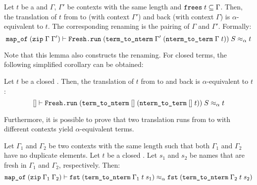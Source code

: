 \begin{lemma}
  Let $t$ be a  and $\Gamma$, $\Gamma'$ be contexts with the same length and $\texttt{\textup{frees}}\;t \subseteq \Gamma$.
  Then, the translation of $t$ from  to  (with context $\Gamma'$) and back (with context $\Gamma$) is $\alpha$-equivalent to $t$.
  The corresponding renaming is the pairing of $\Gamma$ and $\Gamma'$.
  Formally:
  \[ \texttt{\textup{map\_of}}\;(\texttt{\textup{zip}}\;\Gamma\;\Gamma') \vdash \texttt{\textup{Fresh.run}}\;(\texttt{\textup{term\_to\_nterm}}\;\Gamma'\;(\texttt{\textup{nterm\_to\_term}}\;\Gamma\;t))\;S \approx_\alpha t \]
\end{lemma}

\noindent
Note that this lemma also constructs the renaming.
For closed terms, the following simplified corollary can be obtained:

\begin{corollary}
  Let $t$ be a closed .
  Then, the translation of $t$ from  to  and back is $\alpha$-equivalent to $t$:
  \[ [] \vdash \texttt{\textup{Fresh.run}}\;(\texttt{\textup{term\_to\_nterm}}\;[]\;(\texttt{\textup{nterm\_to\_term}}\;[]\;t))\;S \approx_\alpha t \]
\end{corollary}

\noindent
Furthermore, it is possible to prove that two translation runs from  to  with different contexts yield $\alpha$-equivalent terms.

\begin{lemma}
  Let $\Gamma_1$ and $\Gamma_2$ be two contexts with the same length such that both $\Gamma_1$ and $\Gamma_2$ have no duplicate elements.
  Let $t$ be a closed .
  Let $s_1$ and $s_2$ be names that are fresh in $\Gamma_1$ and $\Gamma_2$, respectively.
  Then:
  \[ \texttt{\textup{map\_of}}\;(\texttt{\textup{zip}}\;\Gamma_1\;\Gamma_2) \vdash \texttt{\textup{fst}}\;(\texttt{\textup{term\_to\_nterm}}\;\Gamma_1\;t\;s_1) \approx_\alpha \texttt{\textup{fst}}\;(\texttt{\textup{term\_to\_nterm}}\;\Gamma_2\;t\;s_2) \]
\end{lemma}
%

